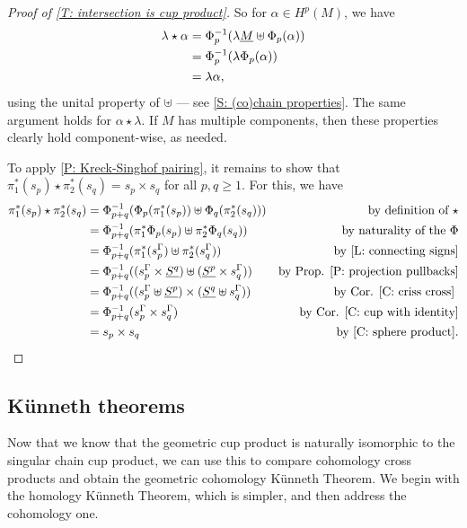 \begin{proof}[Proof of \cref{T: intersection is cup product}]
	So for $\alpha \in H^p(M)$, we have
	\begin{align*}
		\lambda \star \alpha
		& = \Phi_p^{-1}(\lambda\underline{M} \uplus \Phi_p(\alpha)) \\
		& = \Phi_p^{-1}(\lambda\Phi_p(\alpha)) \\
		& = \lambda\alpha,
	\end{align*}
	using the unital property of $\uplus$ --- see \cref{S: (co)chain properties}.
	The same argument holds for $\alpha\star \lambda$.
	If $M$ has multiple components, then these properties clearly hold component-wise, as needed.

	To apply \cref{P: Kreck-Singhof pairing}, it remains to show that $\pi_1^*(s_p) \star \pi_2^*(s_q) = s_p \times s_q$ for all $p,q\geq 1$.
	For this, we have
	\begin{align*}
		\pi_1^*(s_p) \star \pi_2^*(s_q)& = \Phi_{p+q}^{-1}(\Phi_p(\pi_1^*(s_p))\uplus\Phi_q(\pi_2^*(s_q)))&\text{by definition of $\star$}\\
		& = \Phi_{p+q}^{-1}(\pi_1^*\Phi_p(s_p)\uplus\pi_2^*\Phi_q(s_q))&\text{by naturality of the $\Phi$}\\
		& = \Phi_{p+q}^{-1}(\pi_1^*(s_p^\Gamma)\uplus\pi_2^*(s_q^\Gamma))&\text{by \cref{L: connecting signs}}\\
		& = \Phi_{p+q}^{-1}((s_p^\Gamma \times \underline{S^q})\uplus(\underline{S^p} \times s_q^\Gamma))&\text{by Prop.
			\ref{P: projection pullbacks}}\\
		& = \Phi_{p+q}^{-1}((s_p^\Gamma\uplus \underline{S^p})\times( \underline{S^q}\uplus s_q^\Gamma))&\text{by Cor.
			\ref{C: criss cross} }\\
		& = \Phi_{p+q}^{-1}(s_p^\Gamma \times s_q^\Gamma)&\text{by Cor.
			\ref{C: cup with identity}}\\
		& = s_p \times s_q & \text{by \cref{C: sphere product}}.
	\end{align*}
\end{proof}

\subsection{K\"unneth theorems}\label{S: kunneth}

Now that we know that the geometric cup product is naturally isomorphic to the singular chain cup product, we can use this to compare cohomology cross products and obtain the geometric cohomology K\"unneth Theorem.
We begin with the homology K\"unneth Theorem, which is simpler, and then address the cohomology one.


